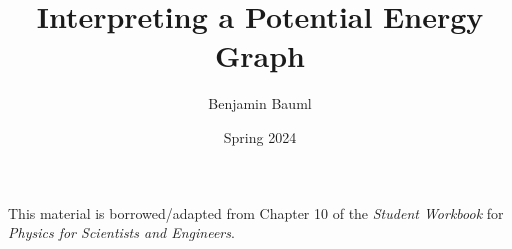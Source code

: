 \documentclass[]{article}
\title{Interpreting a Potential Energy Graph}
\author{Benjamin Bauml}
\date{Spring 2024}
\newcommand{\FileDepth}{../..}
\begin{document}
\maketitle
\begin{center}
	This material is borrowed/adapted from Chapter 10 of the \textit{Student Workbook} for \textit{Physics for Scientists and Engineers}.
\end{center}


\end{document}
